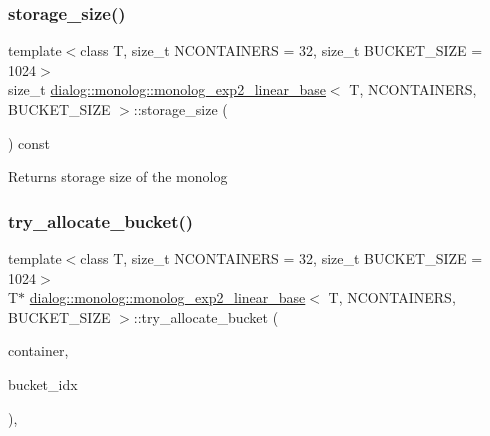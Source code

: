 \subsubsection{\texorpdfstring{storage\+\_\+size()}{storage\_size()}}
{\footnotesize\ttfamily template$<$class T, size\+\_\+t N\+C\+O\+N\+T\+A\+I\+N\+E\+RS = 32, size\+\_\+t B\+U\+C\+K\+E\+T\+\_\+\+S\+I\+ZE = 1024$>$ \\
size\+\_\+t \hyperlink{classdialog_1_1monolog_1_1monolog__exp2__linear__base}{dialog\+::monolog\+::monolog\+\_\+exp2\+\_\+linear\+\_\+base}$<$ T, N\+C\+O\+N\+T\+A\+I\+N\+E\+RS, B\+U\+C\+K\+E\+T\+\_\+\+S\+I\+ZE $>$\+::storage\+\_\+size (\begin{DoxyParamCaption}{ }\end{DoxyParamCaption}) const\hspace{0.3cm}{\ttfamily [inline]}}

\begin{DoxyReturn}{Returns}
storage size of the monolog 
\end{DoxyReturn}
\mbox{\label{classdialog_1_1monolog_1_1monolog__exp2__linear__base_a9c43f1ba9736a52862b07a9138f40728}} 
\subsubsection{\texorpdfstring{try\+\_\+allocate\+\_\+bucket()}{try\_allocate\_bucket()}}
{\footnotesize\ttfamily template$<$class T, size\+\_\+t N\+C\+O\+N\+T\+A\+I\+N\+E\+RS = 32, size\+\_\+t B\+U\+C\+K\+E\+T\+\_\+\+S\+I\+ZE = 1024$>$ \\
T$\ast$ \hyperlink{classdialog_1_1monolog_1_1monolog__exp2__linear__base}{dialog\+::monolog\+::monolog\+\_\+exp2\+\_\+linear\+\_\+base}$<$ T, N\+C\+O\+N\+T\+A\+I\+N\+E\+RS, B\+U\+C\+K\+E\+T\+\_\+\+S\+I\+ZE $>$\+::try\+\_\+allocate\+\_\+bucket (\begin{DoxyParamCaption}\item[{\+\_\+\+\_\+atomic\+\_\+bucket\+\_\+ref $\ast$}]{container,  }\item[{size\+\_\+t}]{bucket\+\_\+idx }\end{DoxyParamCaption})\hspace{0.3cm}{\ttfamily [inline]}, {\ttfamily [protected]}}

